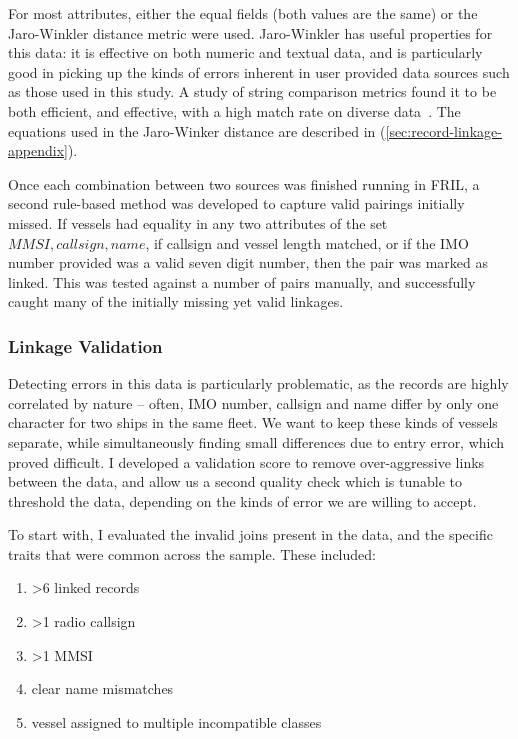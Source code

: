 \documentclass[12pt,letterpaper]{article}
\begin{document}
For most attributes, either the equal fields (both values are the same) or the Jaro-Winkler distance metric were used. Jaro-Winkler has useful properties for this data: it is effective on both numeric and textual data, and is particularly good in picking up the kinds of errors inherent in user provided data sources such as those used in this study. A study of string comparison metrics found it to be both efficient, and effective, with a high match rate on diverse data~\citep{Cohen2003}. The equations used in the Jaro-Winker distance are described in (\ref{sec:record-linkage-appendix}).

Once each combination between two sources was finished running in FRIL, a second rule-based method was developed to capture valid pairings initially missed. If vessels had equality in any two attributes of the set ${MMSI, callsign, name}$, if callsign and vessel length matched, or if the IMO number provided was a valid seven digit number, then the pair was marked as linked. This was tested against a number of pairs manually, and successfully caught many of the initially missing yet valid linkages.

\subsubsection{Linkage Validation}

Detecting errors in this data is particularly problematic, as the records are highly correlated by nature -- often, IMO number, callsign and name differ by only one character for two ships in the same fleet. We want to keep these kinds of vessels separate, while simultaneously finding small differences due to entry error, which proved difficult. I developed a validation score to remove over-aggressive links between the data, and allow us a second quality check which is tunable to threshold the data, depending on the kinds of error we are willing to accept.

To start with, I evaluated the invalid joins present in the data, and the specific traits that were common across the sample. These included:
\begin{enumerate}[noitemsep]
 \item >6 linked records
 \item >1 radio callsign
 \item >1 MMSI
 \item clear name mismatches
 \item vessel assigned to multiple incompatible classes
\end{enumerate}
\end{document}
